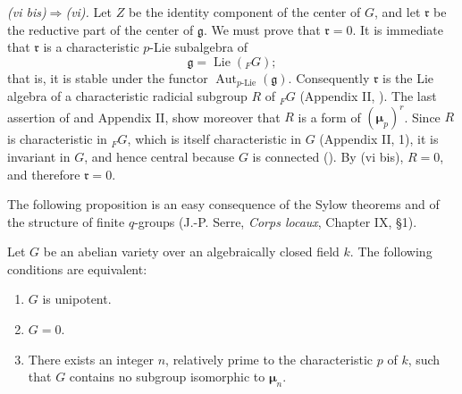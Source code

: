 \medskip\noindent
\textit{(vi bis)\(\Rightarrow\)(vi).}\quad
Let \(Z\) be the identity component of the center of \(G\), and
let \(\mathfrak r\) be the reductive part of the center of
\(\mathfrak g\).  We must prove that \(\mathfrak r=0\).
It is immediate that \(\mathfrak r\) is a characteristic
\(p\)-Lie subalgebra of
\[
  \mathfrak g=\operatorname{Lie}({}_{F}G);
\]
that is, it is stable under the functor
\(\operatorname{Aut}_{p\text{-Lie}}(\mathfrak g)\).
Consequently \(\mathfrak r\) is the Lie algebra of a
characteristic radicial subgroup \(R\) of \({}_{F}G\)
(Appendix II, ).  The last assertion of  and Appendix II,
 show moreover that \(R\) is a form of
\((\boldsymbol\mu_p)^r\).  Since \(R\) is characteristic in
\({}_{F}G\), which is itself characteristic in \(G\)
(Appendix II, 1), it is invariant in \(G\), and hence central
because \(G\) is connected ().  By (vi bis),
\(R=0\), and therefore \(\mathfrak r=0\).


The following proposition is an easy consequence of the Sylow
theorems and of the structure of finite \(q\)-groups
(J.-P. Serre, \emph{Corps locaux}, Chapter IX, \S1).



Let \(G\) be an abelian variety over an algebraically closed field
\(k\).  The following conditions are equivalent:
\begin{enumerate}
\item[(i)] 
  \(G\) is unipotent.
\item[(ii)] 
  \(G=0\).
\item[(iii)] 
  There exists an integer \(n\), relatively prime to the
  characteristic \(p\) of \(k\), such that \(G\) contains no
  subgroup isomorphic to \(\boldsymbol\mu_n\).
\end{enumerate}
